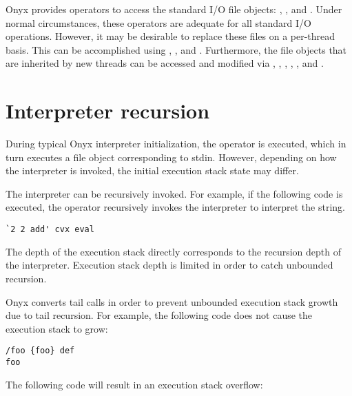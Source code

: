 Onyx provides operators to access the standard I/O file objects:
,
, and
.  Under normal circumstances,
these operators are adequate for all standard I/O operations.  However, it may
be desirable to replace these files on a per-thread basis.  This can be
accomplished using ,
, and
.  Furthermore, the file
objects that are inherited by new threads can be accessed and modified via
,
,
,
,
, and
.

\section{Interpreter recursion}

During typical Onyx interpreter initialization, the
 operator is executed, which in
turn executes a file object corresponding to stdin.  However, depending on how
the interpreter is invoked, the initial execution stack state may differ.

The interpreter can be recursively invoked.  For example, if the following code
is executed, the  operator
recursively invokes the interpreter to interpret the string.
\begin{verbatim}
`2 2 add' cvx eval
\end{verbatim}

The depth of the execution stack directly corresponds to the recursion depth of
the interpreter.  Execution stack depth is limited in order to catch unbounded
recursion.

Onyx converts tail calls in order to prevent unbounded execution stack growth
due to tail recursion.  For example, the following code does not cause the
execution stack to grow:

\begin{verbatim}
/foo {foo} def
foo
\end{verbatim}

The following code will result in an execution stack overflow:

